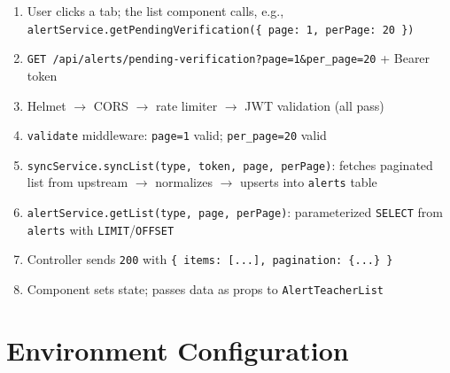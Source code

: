 \documentclass[11pt]{article}
\begin{document}
\begin{enumerate}
  \item User clicks a tab; the list component calls, e.g.,
        \texttt{alertService.getPendingVerification(\{ page: 1, perPage: 20 \})}
  \item \texttt{GET /api/alerts/pending-verification?page=1\&per\_page=20} + Bearer token
  \item Helmet $\rightarrow$ CORS $\rightarrow$ rate limiter $\rightarrow$ JWT validation (all pass)
  \item \texttt{validate} middleware: \texttt{page=1} valid; \texttt{per\_page=20} valid
  \item \texttt{syncService.syncList(type, token, page, perPage)}: fetches paginated list from
        upstream $\rightarrow$ normalizes $\rightarrow$ upserts into \texttt{alerts} table
  \item \texttt{alertService.getList(type, page, perPage)}: parameterized \texttt{SELECT}
        from \texttt{alerts} with \texttt{LIMIT}/\texttt{OFFSET}
  \item Controller sends \texttt{200} with \texttt{\{ items: [...], pagination: \{...\} \}}
  \item Component sets state; passes data as props to \texttt{AlertTeacherList}
\end{enumerate}

\section{Environment Configuration}
\end{document}
